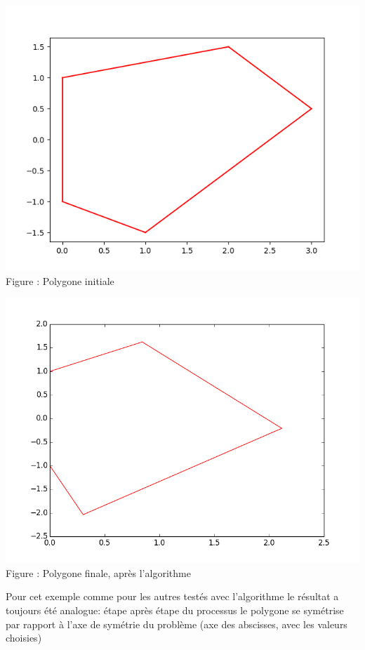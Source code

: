 \documentclass[a4paper,reqno]{article}
\begin{document}
\begin{center}
	\includegraphics[scale=0.5]{initialPolygon.png}
	\\ Figure : Polygone initiale 
\end{center}

\begin{center}
	\includegraphics[scale=0.5]{finale.png}
	\\ Figure : Polygone finale, après l'algorithme 
\end{center}

Pour cet exemple comme pour les autres testés avec l'algorithme le résultat a toujours été analogue: étape après étape du processus le polygone se symétrise par rapport à l'axe de symétrie du problème (axe des abscisses, avec les valeurs choisies)
\end{document}
